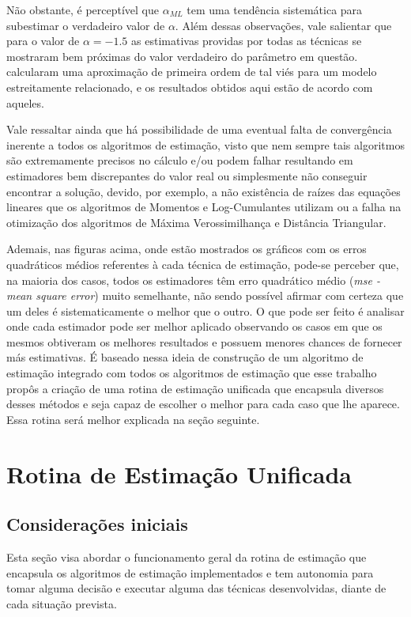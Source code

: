 Não obstante, é perceptível que $\alpha_{ML}$ tem uma tendência sistemática para subestimar o verdadeiro valor de $\alpha$. Além dessas observações, vale salientar que para o valor de $\alpha = -1.5$ as estimativas providas por todas as técnicas se mostraram bem próximas do valor verdadeiro do parâmetro em questão. \citet{FreryStochasticDistances2015} calcularam uma aproximação de primeira ordem de tal viés para um modelo estreitamente relacionado, e os resultados obtidos aqui estão de acordo com aqueles.

Vale ressaltar ainda que há possibilidade de uma eventual falta de convergência inerente a todos os algoritmos de estimação, visto que nem sempre tais algoritmos são extremamente precisos no cálculo e/ou podem falhar resultando em estimadores bem discrepantes do valor real ou simplesmente não conseguir encontrar a solução, devido, por exemplo, a não existência de raízes das equações lineares que os algoritmos de Momentos e Log-Cumulantes utilizam ou a falha na otimização dos algoritmos de Máxima Verossimilhança e Distância Triangular.

Ademais, nas figuras acima, onde estão mostrados os gráficos com os erros quadráticos médios referentes à cada técnica de estimação, pode-se perceber que, na maioria dos casos, todos os estimadores têm erro quadrático médio (\textit{mse - mean square error}) muito semelhante, não sendo possível afirmar com certeza que um deles é sistematicamente o melhor que o outro. O que pode ser feito é analisar onde cada estimador pode ser melhor aplicado observando os casos em que os mesmos obtiveram os melhores resultados e possuem menores chances de fornecer más estimativas. É baseado nessa ideia de construção de um algoritmo de estimação integrado com todos os algoritmos de estimação que esse trabalho propôs a criação de uma rotina de estimação unificada que encapsula diversos desses métodos e seja capaz de escolher o melhor para cada caso que lhe aparece. Essa rotina será melhor explicada na seção seguinte.

\section{Rotina de Estimação Unificada}

\subsection{Considerações iniciais}

Esta seção visa abordar o funcionamento geral da rotina de estimação que encapsula os algoritmos de estimação implementados e tem autonomia para tomar alguma decisão e executar alguma das técnicas desenvolvidas, diante de cada situação prevista. 

